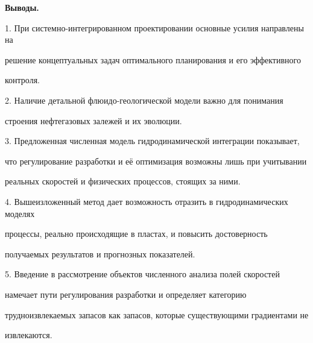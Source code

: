 \textbf{Выводы. }



1. При системно-интегрированном проектировании основные усилия направлены на

решение концептуальных задач оптимального планирования и его эффективного

контроля.



2. Наличие детальной флюидо-геологической модели важно для понимания

строения нефтегазовых залежей и их эволюции.



3. Предложенная численная модель гидродинамической интеграции показывает,

что регулирование разработки и её оптимизация возможны лишь при учитывании

реальных скоростей и физических процессов, стоящих за ними.



4. Вышеизложенный метод дает возможность отразить в гидродинамических моделях

 процессы, реально происходящие в пластах, и повысить достоверность

получаемых результатов и прогнозных показателей.



5. Введение в рассмотрение объектов численного анализа полей скоростей

намечает пути регулирования разработки и определяет категорию

трудноизвлекаемых запасов как запасов, которые существующими градиентами не

извлекаются.







